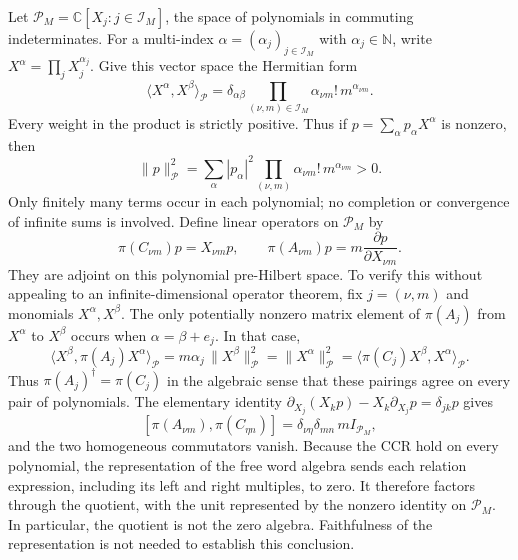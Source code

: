 Let $\mathcal P_M=\mathbb C[X_j:j\in\mathcal I_M]$, the space of
polynomials in commuting indeterminates.  For a multi-index
$\alpha=(\alpha_j)_{j\in\mathcal I_M}$ with $\alpha_j\in\mathbb N$,
write $X^\alpha=\prod_jX_j^{\alpha_j}$.  Give this vector space the
Hermitian form
\begin{equation}
 \langle X^\alpha,X^\beta\rangle_{\mathcal P}
 =\delta_{\alpha\beta}
     \prod_{(\nu,m)\in\mathcal I_M}\alpha_{\nu m}!\,
                                           m^{\alpha_{\nu m}}.
 \label{eq:ch19-polynomial-gram}
\end{equation}
Every weight in the product is strictly positive.  Thus if
$p=\sum_\alpha p_\alpha X^\alpha$ is nonzero, then
\begin{equation}
 \|p\|_{\mathcal P}^2
 =\sum_\alpha |p_\alpha|^2
    \prod_{(\nu,m)}\alpha_{\nu m}!\,m^{\alpha_{\nu m}}>0.
 \label{eq:ch19-polynomial-norm}
\end{equation}
Only finitely many terms occur in each polynomial; no completion or
convergence of infinite sums is involved.  Define linear operators on
$\mathcal P_M$ by
\begin{equation}
  \pi(C_{\nu m})p=X_{\nu m}p,
  \qquad
  \pi(A_{\nu m})p=m\frac{\partial p}{\partial X_{\nu m}}.
  \label{eq:ch19-polynomial-representation}
\end{equation}
They are adjoint on this polynomial pre-Hilbert space.  To verify this
without appealing to an infinite-dimensional operator theorem, fix
$j=(\nu,m)$ and monomials $X^\alpha,X^\beta$.  The only potentially
nonzero matrix element of $\pi(A_j)$ from $X^\alpha$ to $X^\beta$ occurs
when $\alpha=\beta+e_j$.  In that case,
\[
 \langle X^\beta,\pi(A_j)X^\alpha\rangle_{\mathcal P}
   =m\alpha_j\,\|X^\beta\|_{\mathcal P}^2
   =\|X^\alpha\|_{\mathcal P}^2
   =\langle\pi(C_j)X^\beta,X^\alpha\rangle_{\mathcal P}.
\]
Thus $\pi(A_j)^\dagger=\pi(C_j)$ in the algebraic sense that these
pairings agree on every pair of polynomials.  The elementary identity
$\partial_{X_j}(X_kp)-X_k\partial_{X_j}p=\delta_{jk}p$ gives
\[
 [\pi(A_{\nu m}),\pi(C_{\eta n})]
     =\delta_{\nu\eta}\delta_{mn}\,mI_{\mathcal P_M},
\]
and the two homogeneous commutators vanish.  Because the CCR hold on every polynomial, the representation of the free
word algebra sends each relation expression, including its left and
right multiples, to zero.  It therefore factors through the quotient,
with the unit represented by the nonzero identity on $\mathcal P_M$.
In particular, the quotient is not the zero algebra.  Faithfulness of
the representation is not needed to establish this conclusion.

